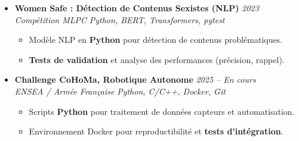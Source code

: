 \documentclass[a4paper,11pt]{article}
\begin{document}
\begin{itemize}[leftmargin=*, label={-}]
\item \textbf{Women Safe : Détection de Contenus Sexistes (NLP)} \hfill \textit{2023} \\
\textit{Compétition MLPC} \hfill \textit{Python, BERT, Transformers, pytest}
\vspace{-2pt}
    \begin{itemize}[leftmargin=0.4cm, nosep, label=\tiny$\bullet$]
        \item \small{Modèle NLP en \textbf{Python} pour détection de contenus problématiques.}
        \item \small{\textbf{Tests de validation} et analyse des performances (précision, rappel).}
    \end{itemize}
\vspace{3pt}

\item \textbf{Challenge CoHoMa, Robotique Autonome} \hfill \textit{2025 -- En cours} \\
\textit{ENSEA / Armée Française} \hfill \textit{Python, C/C++, Docker, Git}
\vspace{-2pt}
    \begin{itemize}[leftmargin=0.4cm, nosep, label=\tiny$\bullet$]
        \item \small{Scripts \textbf{Python} pour traitement de données capteurs et automatisation.}
        \item \small{Environnement Docker pour reproductibilité et \textbf{tests d'intégration}.}
    \end{itemize}

\end{itemize}

\end{document}
